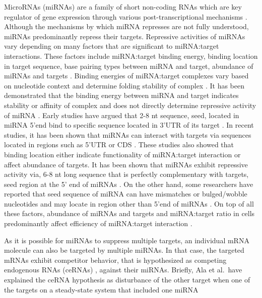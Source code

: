 \documentclass[a4,center,fleqn]{NAR}
\begin{document}
MicroRNAs (miRNAs) are a family of short non-coding RNAs which are key
regulator of gene expression through various post-transcriptional
mechanisms \citep{brennecke2005principles}. Although the mechanisms by
which miRNA represses are not fully understood, miRNAs predominantly
repress their targets. Repressive activities of miRNAs vary depending on
many factors that are significant to miRNA:target interactions. These
factors include miRNA:target binding energy, binding location in target
sequence, base pairing types between miRNA and target, abundance of
miRNAs and targets \citep{grimson_microrna_2007}. Binding energies of
miRNA:target complexes vary based on nucleotide context and determine
folding stability of complex \citep{cao_predicting_2012}. It has been
demonstrated that the binding energy between miRNA and target indicates
stability or affinity of complex \citep{helwak_mapping_2013} and does
not directly determine repressive activity of miRNA
\citep{cao_predicting_2012}. Early studies have argued that 2-8 nt
sequence, seed, located in miRNA 5'end bind to specific sequence located
in 3'UTR of its target
\citep{bartel_micrornas_2004, lewis_conserved_2005}. In recent studies,
it has been shown that miRNAs can interact with targets via sequences
located in regions such as 5'UTR or CDS
\citep{hausser_analysis_2013, helwak_mapping_2013, moore_mirnatarget_2015}.
These studies also showed that binding location either indicate
functionality of miRNA:target interaction or affect abundance of
targets. It has been shown that miRNAs exhibit repressive activity via,
6-8 nt long sequence that is perfectly complementary with targets, seed
region at the 5' end of miRNAs
\citep{bartel_micrornas:_2009, grimson_microrna_2007}. On the other
hand, some researchers have reported that seed sequence of miRNA can
have mismatches or bulged/wobble nucleotides \citep{chi2012alternative}
and may locate in region other than 5'end of miRNAs
\citep{hafner_transcriptome-wide_2010, helwak_mapping_2013}. On top of
all these factors, abundance of miRNAs and targets and miRNA:target
ratio in cells predominantly affect efficiency of miRNA:target
interaction
\citep{arvey_target_2010, bosson_endogenous_2014, denzler_assessing_2014}.

As it is possible for miRNAs to suppress multiple targets, an individual
mRNA molecule can also be targeted by multiple miRNAs. In that case, the
targeted mRNAs exhibit competitor behavior, that is hypothesized as
competing endogenous RNAs (ceRNAs)
\citep{ala_integrated_2013, cesana_deciphering_2013}, against their
miRNAs. Briefly, Ala et al.~have explained the ceRNA hypothesis as
disturbance of the other target when one of the targets on a
steady-state system that included one miRNA
\end{document}
